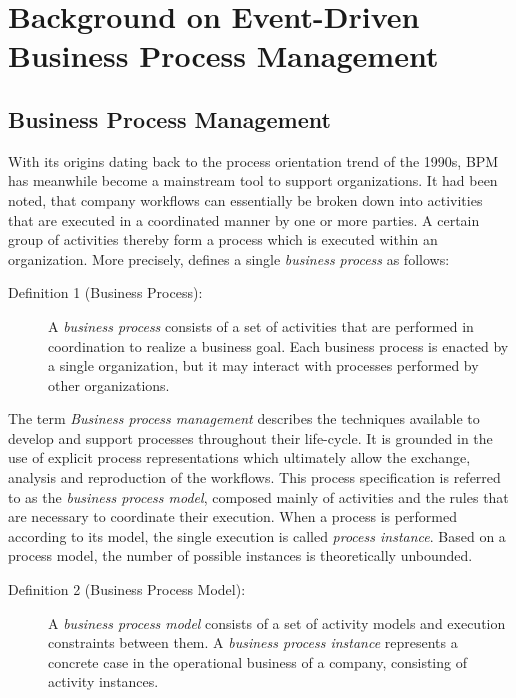\chapter{Background on Event-Driven Business Process Management}\label{ch:background}

\section{Business Process Management}\label{ch:bg:bpm}
With its origins dating back to the process orientation trend of the 1990s, \ac{BPM} has meanwhile become a mainstream tool to support organizations.
It had been noted, that company workflows can essentially be broken down into activities that are executed in a coordinated manner by one or more parties.
A certain group of activities thereby form a process which is executed within an organization.
More precisely, \citeauthor{weske:bpm-book} \cite{weske:bpm-book} defines a single \emph{business process} as follows:

\begin{description}
	\item[Definition 1 (Business Process):]
	A \emph{business process} consists of a set of activities that are performed in coordination to realize a business goal. Each business process is enacted by a single organization, but it may interact with processes performed by other organizations.
\end{description}

\noindent The term \emph{Business process management} describes the techniques available to develop and support processes throughout their life-cycle.
It is grounded in the use of explicit process representations which ultimately allow the exchange, analysis and reproduction of the workflows.
This process specification is referred to as the \emph{business process model}, composed mainly of activities and the rules that are necessary to coordinate their execution.
When a process is performed according to its model, the single execution is called \textit{process instance}.
Based on a process model, the number of possible instances is theoretically unbounded.

\begin{description}
	\item[Definition 2 (Business Process Model):]
	A \emph{business process model} consists of a set of activity models and execution constraints between them. A \emph{business process instance} represents a concrete case in the operational business of a company, consisting of activity instances.
	\cite[p.~7]{weske:bpm-book}
\end{description}

